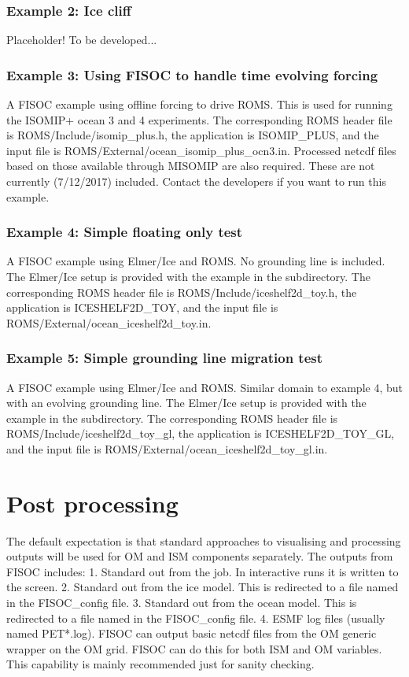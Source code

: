 \documentclass[12pt]{article}
\begin{document}
\subsubsection{Example 2: Ice cliff}
Placeholder!  To be developed...

\subsubsection{Example 3: Using FISOC to handle time evolving forcing}
A FISOC example using offline forcing to drive ROMS. 
This is used for running the ISOMIP+ ocean 3 and 4 experiments.
The corresponding ROMS header file is ROMS/Include/isomip\_plus.h, 
the application is ISOMIP\_PLUS, 
and the input file is ROMS/External/ocean\_isomip\_plus\_ocn3.in.
Processed netcdf files based on those available through MISOMIP 
are also required.  These are not currently (7/12/2017) 
included.  Contact the developers if you want to run this example. 

\subsubsection{Example 4: Simple floating only test}
A FISOC example using Elmer/Ice and ROMS. No grounding line is included. 
The Elmer/Ice setup is provided with the example in the subdirectory. 
The corresponding ROMS header file is ROMS/Include/iceshelf2d\_toy.h, 
the application is ICESHELF2D\_TOY, 
and the input file is ROMS/External/ocean\_iceshelf2d\_toy.in.

\subsubsection{Example 5: Simple grounding line migration test}
A FISOC example using Elmer/Ice and ROMS. Similar domain to 
example 4, but with an evolving grounding line.
The Elmer/Ice setup is provided with the example in the subdirectory. 
The corresponding ROMS header file is ROMS/Include/iceshelf2d\_toy\_gl, 
the application is ICESHELF2D\_TOY\_GL, 
and the input file is ROMS/External/ocean\_iceshelf2d\_toy\_gl.in.




\section{Post processing}
The default expectation is that standard approaches to visualising and 
processing outputs will be used for OM and ISM components separately. 
The outputs from FISOC includes:
1. Standard out from the job.  In interactive runs it is written to the screen.
2. Standard out from the ice model.  This is redirected to a file named in the FISOC_config file.
3. Standard out from the ocean model.  This is redirected to a file named in the FISOC_config file.
4. ESMF log files (usually named PET*.log).
FISOC can output basic netcdf files from the OM generic wrapper 
on the OM grid. 
FISOC can do this for both ISM and OM variables.
This capability is mainly recommended just for sanity checking.
\end{document}
